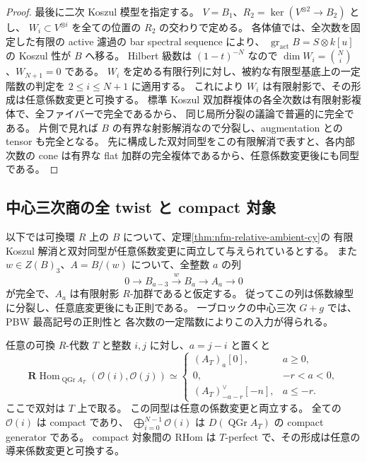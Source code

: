 \begin{proof}
最後に二次 Koszul 模型を指定する。
$V=B_1$、$R_2=\ker(V^{\otimes2}\to B_2)$ とし、
$W_i\subset V^{\otimes i}$ を全ての位置の $R_2$ の交わりで定める。
各体値では、全次数を固定した有限の active 濾過の bar spectral sequence により、
$\operatorname{gr}_{\mathrm{act}}B=S\otimes k[u]$ の Koszul 性が $B$ へ移る。
Hilbert 級数は $(1-t)^{-N}$ なので
$\dim W_i=\binom Ni$、$W_{N+1}=0$ である。
$W_i$ を定める有限行列に対し、被約な有限型基底上の一定階数の判定を
$2\leq i\leq N+1$ に適用する。
これにより $W_i$ は有限射影で、その形成は任意係数変更と可換する。
標準 Koszul 双加群複体の各全次数は有限射影複体で、全ファイバーで完全であるから、
同じ局所分裂の議論で普遍的に完全である。
片側で見れば $B$ の有界な射影解消なので分裂し、augmentation との tensor も完全となる。
先に構成した双対同型をこの有限解消で表すと、各内部次数の cone は有界な
flat 加群の完全複体であるから、任意係数変更後にも同型である。
\end{proof}

\subsection{中心三次商の全 twist と compact 対象}

以下では可換環 $R$ 上の $B$ について、定理\ref{thm:nfm-relative-ambient-cy}の
有限 Koszul 解消と双対同型が任意係数変更に両立して与えられているとする。
また $w\in Z(B)_3$、$A=B/(w)$ について、全整数 $a$ の列
\begin{equation}
\label{eq:nfm-relative-central-split}
 0\longrightarrow B_{a-3}\xrightarrow{w}B_a\longrightarrow A_a\longrightarrow0
\end{equation}
が完全で、$A_a$ は有限射影 $R$-加群であると仮定する。
従ってこの列は係数線型に分裂し、任意底変更後にも正則である。
一ブロックの中心三次 $G+g$ では、PBW 最高記号の正則性と
各次数の一定階数によりこの入力が得られる。

\begin{theorem}
\label{thm:nfm-relative-line-cohomology}
任意の可換 $R$-代数 $T$ と整数 $i,j$ に対し、$a=j-i$ と置くと
\begin{equation}
\label{eq:nfm-relative-line-cohomology}
 \mathbf R\operatorname{Hom}_{\operatorname{QGr}A_T}
   (\mathcal O(i),\mathcal O(j))\simeq
 \begin{cases}
  (A_T)_a[0],&a\geq0,\\
  0,&-r<a<0,\\
  (A_T)_{-a-r}^{\vee}[-n],&a\leq-r.
 \end{cases}
\end{equation}
ここで双対は $T$ 上で取る。
この同型は任意の係数変更と両立する。
全ての $\mathcal O(i)$ は compact であり、
$\bigoplus_{i=0}^{N-1}\mathcal O(i)$ は
$D(\operatorname{QGr}A_T)$ の compact generator である。
compact 対象間の RHom は $T$-perfect で、その形成は任意の導来係数変更と可換する。
\end{theorem}

